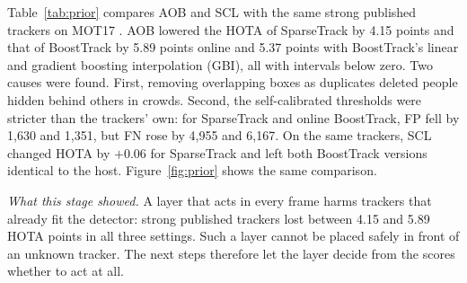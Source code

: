 \documentclass[pdflatex,sn-mathphys-num,iicol]{sn-jnl}
\newcommand{\scl}{SCL}
\newcommand{\aob}{AOB}
\begin{document}
Table~\ref{tab:prior} compares \aob{} and \scl{} with the same strong
published trackers on MOT17 \cite{milan2016mot16}. \aob{} lowered the HOTA of
SparseTrack by 4.15 points and that of BoostTrack by 5.89 points online and
5.37 points with BoostTrack's linear and gradient boosting interpolation (GBI), all with
intervals below zero. Two causes
were found. First, removing overlapping boxes as duplicates deleted people
hidden behind others in crowds. Second, the self-calibrated thresholds were
stricter than the trackers' own: for SparseTrack and online BoostTrack, FP
fell by 1,630 and 1,351, but FN rose by 4,955 and 6,167. On the same trackers, \scl{} changed HOTA by $+0.06$ for SparseTrack
and left both BoostTrack versions identical to the host.
Figure~\ref{fig:prior} shows the same comparison.

\emph{What this stage showed.} A layer that acts in every frame harms
trackers that already fit the detector: strong published trackers lost
between 4.15 and 5.89 HOTA points in all three settings. Such a layer cannot
be placed safely in front of an unknown tracker. The next steps therefore let
the layer decide from the scores whether to act at all.
\end{document}
